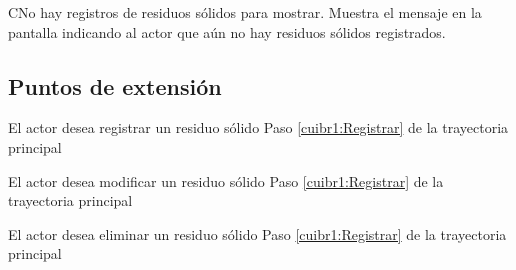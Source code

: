   \begin{UCtrayectoriaA}{C}{No hay registros de residuos sólidos para mostrar.}
    \UCpaso[\UCsist] Muestra el mensaje  en la pantalla  indicando al actor que aún no hay residuos sólidos registrados. 
 \end{UCtrayectoriaA}


\subsection{Puntos de extensión}

\UCExtensionPoint
{El actor desea registrar un residuo sólido}
{ Paso \ref{cuibr1:Registrar} de la trayectoria principal}
{}

\UCExtensionPoint
{El actor desea modificar un residuo sólido}
{ Paso \ref{cuibr1:Registrar} de la trayectoria principal}
{}

\UCExtensionPoint
{El actor desea eliminar un residuo sólido}
{ Paso \ref{cuibr1:Registrar} de la trayectoria principal}
{}
